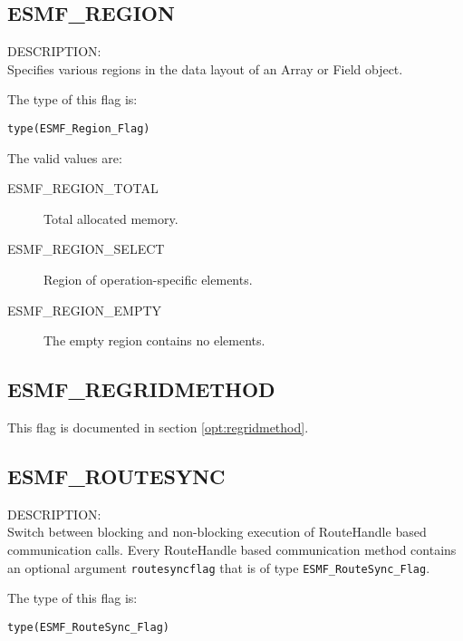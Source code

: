 \subsection{ESMF\_REGION}
\label{const:region}
{\sf DESCRIPTION:\\}
Specifies various regions in the data layout of an Array or Field object.

The type of this flag is:

{\tt type(ESMF\_Region\_Flag)}

The valid values are:
\begin{description}
\item [ESMF\_REGION\_TOTAL]
      Total allocated memory.
\item [ESMF\_REGION\_SELECT]
      Region of operation-specific elements.
\item [ESMF\_REGION\_EMPTY]
      The empty region contains no elements.
\end{description}

\subsection{ESMF\_REGRIDMETHOD}
This flag is documented in section \ref{opt:regridmethod}.

\subsection{ESMF\_ROUTESYNC}
\label{const:routesync}
{\sf DESCRIPTION:\\}  
Switch between blocking and non-blocking execution of RouteHandle based
communication calls. Every RouteHandle based communication method contains
an optional argument {\tt routesyncflag} that is of type {\tt ESMF\_RouteSync\_Flag}.

The type of this flag is:

{\tt type(ESMF\_RouteSync\_Flag)}

